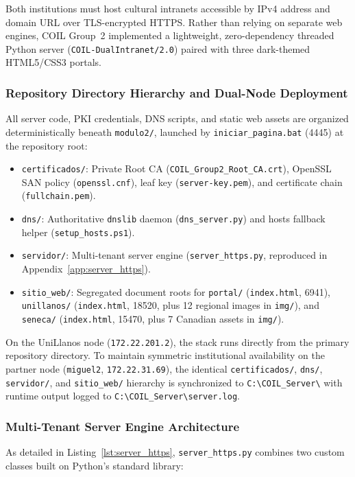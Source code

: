 Both institutions must host cultural intranets accessible by IPv4 address and domain URL over TLS-encrypted HTTPS. Rather than relying on separate web engines, COIL Group~2 implemented a lightweight, zero-dependency threaded Python server (\texttt{COIL-DualIntranet/2.0}) paired with three dark-themed HTML5/CSS3 portals.

\subsubsection{Repository Directory Hierarchy and Dual-Node Deployment}
All server code, PKI credentials, DNS scripts, and static web assets are organized deterministically beneath \nolinkurl{modulo2/}, launched by \nolinkurl{iniciar_pagina.bat} (\qty{4445}{\byte}) at the repository root:
\begin{itemize}
    \item \nolinkurl{certificados/}: Private Root CA (\nolinkurl{COIL_Group2_Root_CA.crt}), OpenSSL SAN policy (\nolinkurl{openssl.cnf}), leaf key (\nolinkurl{server-key.pem}), and certificate chain (\nolinkurl{fullchain.pem}).
    \item \nolinkurl{dns/}: Authoritative \texttt{dnslib} daemon (\nolinkurl{dns_server.py}) and hosts fallback helper (\nolinkurl{setup_hosts.ps1}).
    \item \nolinkurl{servidor/}: Multi-tenant server engine (\nolinkurl{server_https.py}, reproduced in Appendix~\ref{app:server_https}).
    \item \nolinkurl{sitio_web/}: Segregated document roots for \nolinkurl{portal/} (\nolinkurl{index.html}, \qty{6941}{\byte}), \nolinkurl{unillanos/} (\nolinkurl{index.html}, \qty{18520}{\byte}, plus 12 regional images in \nolinkurl{img/}), and \nolinkurl{seneca/} (\nolinkurl{index.html}, \qty{15470}{\byte}, plus 7 Canadian assets in \nolinkurl{img/}).
\end{itemize}
On the UniLlanos node (\nolinkurl{172.22.201.2}), the stack runs directly from the primary repository directory. To maintain symmetric institutional availability on the partner node (\texttt{miguel2}, \nolinkurl{172.22.31.69}), the identical \nolinkurl{certificados/}, \nolinkurl{dns/}, \nolinkurl{servidor/}, and \nolinkurl{sitio_web/} hierarchy is synchronized to \texttt{C:\textbackslash{}COIL\_Server\textbackslash{}} with runtime output logged to \texttt{C:\textbackslash{}COIL\_Server\textbackslash{}server.log}.

\subsubsection{Multi-Tenant Server Engine Architecture}
As detailed in Listing~\ref{lst:server_https}, \nolinkurl{server_https.py} combines two custom classes built on Python's standard library:

